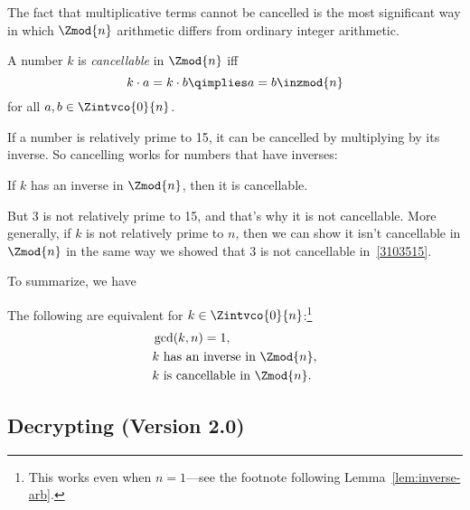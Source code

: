 The fact that multiplicative terms cannot be cancelled is the most
significant way in which $\Zmod{n}$ arithmetic differs from ordinary
integer arithmetic.

\begin{definition}
A number $k$ is \emph{cancellable} in $\Zmod{n}$ iff
\[
k \cdot a = k \cdot b  \qimplies a = b  \inzmod{n}
\]
for all $a,b \in \Zintvco{0}{n}$.
\end{definition}

If a number is relatively prime to 15, it can be cancelled by
multiplying by its inverse.  So cancelling works for numbers that have
inverses:
\begin{lemma}\label{lem:cancellation-arb}
If $k$ has an inverse in $\Zmod{n}$, then it is cancellable.
\end{lemma}

But 3 is not relatively prime to 15, and that's why it is not
cancellable.  More generally, if $k$ is not relatively prime to $n$,
then we can show it isn't cancellable in $\Zmod{n}$ in the same way we
showed that 3 is not cancellable in~\eqref{3103515}.

\iffalse
Namely, suppose $\gcd(k,n) = m > 1$.  So $k/m$ and $n/m$ are
positive integers, and we have
\begin{align*}
          (n/m) \cdot k & = n \cdot (k/m),\\
\rem{(n/m) \cdot k}{n} & = \rem{n \cdot (k/m)}{n},\\
        (n/m) \cdot k & = 0 = 0 \cdot k \inzmod{n}.
\end{align*}
Now $k$ can't be cancelled or we would reach the false conclusion that
$n/m = 0$.
\fi

To summarize, we have
\begin{theorem}\label{thm:mod_inverses}
The following are equivalent for $k \in \Zintvco{0}{n}$:\footnote{This
  works even when $n=1$---see the footnote following
  Lemma~\ref{lem:inverse-arb}.}
\begin{align*}
& \gcd(k, n) = 1,\\
& k \text{ has an inverse in $\Zmod{n}$},\\
& k \text{ is cancellable in $\Zmod{n}$}.
\end{align*}
\end{theorem}

\subsection{Decrypting (Version 2.0)}

